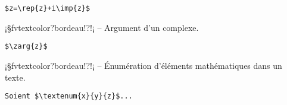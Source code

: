\documentclass[11pt,a4paper,rgb]{report}
\begin{document}
\setlength{\leftskip}{.75cm}%
\setlength{\textwidth}{17.25cm}%

\colorbox{blue!15}{}
\hfill
\begin{minipage}{.65\textwidth}
	\begin{lstlisting}[linewidth=\textwidth, language={[LaTeX]TeX}]
	$z=\rep{z}+i\imp{z}$
	\end{lstlisting}
\end{minipage}

\setlength{\leftskip}{0pt}
\setlength{\textwidth}{18cm}%


\vspace*{.75cm}

\inCodeStub¡§fvtextcolor?bordeau!?!¡ -- Argument d'un complexe.

\setlength{\leftskip}{.75cm}%
\setlength{\textwidth}{17.25cm}%

\colorbox{blue!15}{}
\hfill
\begin{minipage}{.65\textwidth}
	\begin{lstlisting}[linewidth=\textwidth, language={[LaTeX]TeX}]
	$\zarg{z}$
	\end{lstlisting}
\end{minipage}

\setlength{\leftskip}{0pt}
\setlength{\textwidth}{18cm}%


\vspace*{.75cm}

\inCodeStub¡§fvtextcolor?bordeau!?!¡ -- Énumération d'éléments mathématiques dans un texte.

\setlength{\leftskip}{.75cm}%
\setlength{\textwidth}{17.25cm}%

\colorbox{blue!15}{}
\hfill
\begin{minipage}{.65\textwidth}
	\begin{lstlisting}[linewidth=\textwidth, language={[LaTeX]TeX}]
	Soient $\textenum{x}{y}{z}$...
	\end{lstlisting}
\end{minipage}

\setlength{\leftskip}{0pt}
\setlength{\textwidth}{18cm}%


\vspace*{.75cm}
\end{document}

